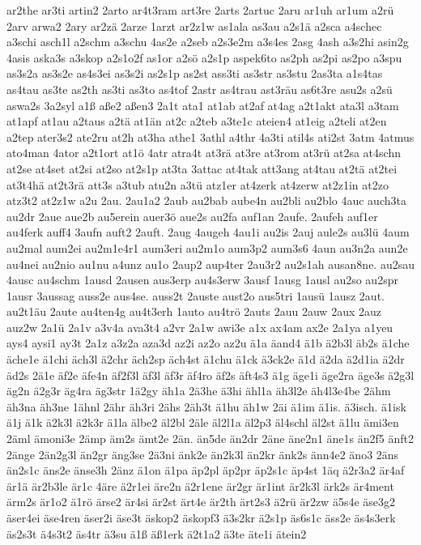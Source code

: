 {ar2the
ar3ti
artin2
2arto
ar4t3ram
art3re
2arts
2artuc
2aru
ar1uh
ar1um
a2rü
2arv
arwa2
2ary
ar2zä
2arze
1arzt
ar2z1w
as1ala
as3au
a2s1ä
a2sca
a4schec
a3schi
asch1l
a2schm
a3schu
4as2e
a2seb
a2s3e2m
a3s4es
2asg
4ash
a3s2hi
asin2g
4asis
aska3s
a3skop
a2s1o2f
as1or
a2sö
a2s1p
aspek6to
as2ph
as2pi
as2po
a3spu
as3s2a
as3s2e
as4s3ei
as3s2i
as2s1p
as2st
ass3ti
as3str
as3stu
2as3ta
a1s4tas
as4tau
as3te
as2th
as3ti
as3to
as4tof
2astr
as4trau
ast3räu
as6t3re
asu2s
a2sü
aswa2s
3a2syl
a1ß
aße2
aßen3
2a1t
ata1
at1ab
at2af
at4ag
a2t1akt
ata3l
a3tam
at1apf
at1au
a2taus
a2tä
at1än
at2c
a2teb
a3te1c
ateien4
at1eig
a2teli
at2en
a2tep
ater3s2
ate2ru
at2h
at3ha
athe1
3athl
a4thr
4a3ti
atil4s
ati2st
3atm
4atmus
ato4man
4ator
a2t1ort
at1ö
4atr
atra4t
at3rä
at3re
at3rom
at3rü
at2sa
at4schn
at2se
at4set
at2si
at2so
at2s1p
at3ta
3attac
at4tak
att3ang
at4tau
at2tä
at2tei
at3t4hä
at2t3rä
att3s
a3tub
atu2n
a3tü
atz1er
at4zerk
at4zerw
at2z1in
at2zo
atz3t2
at2z1w
a2u
2au.
2au1a2
2aub
au2bab
aube4n
au2bli
au2blo
4auc
auch3ta
au2dr
2aue
aue2b
au5erein
auer3ö
aue2s
au2fa
auf1an
2aufe.
2aufeh
auf1er
au4ferk
auff4
3aufn
auft2
2auft.
2aug
4augeh
4au1i
au2is
2auj
aule2s
au3lü
4aum
au2mal
aum2ei
au2m1e4r1
aum3eri
au2m1o
aum3p2
aum3s6
4aun
au3n2a
aun2e
au4nei
au2nio
au1nu
a4unz
au1o
2aup2
aup4ter
2au3r2
au2s1ah
ausan8ne.
au2sau
4ausc
au4schm
1ausd
2ausen
aus3erp
au4s3erw
3ausf
1ausg
1ausl
au2so
au2spr
1ausr
3aussag
auss2e
aus4se.
auss2t
2auste
aust2o
aus5tri
1ausü
1ausz
2aut.
au2t1äu
2aute
au4ten4g
au4t3erh
1auto
au4trö
2auts
2auu
2auw
2aux
2auz
auz2w
2a1ü
2a1v
a3v4a
ava3t4
a2vr
2a1w
awi3e
a1x
ax4am
ax2e
2a1ya
a1yeu
ays4
aysi1
ay3t
2a1z
a3z2a
aza3d
az2i
az2o
az2u
ä1a
äand4
ä1b
ä2b3l
äb2s
ä1che
äche1e
ä1chi
äch3l
ä2chr
äch2sp
äch4st
ä1chu
ä1ck
ä3ck2e
ä1d
ä2da
ä2d1ia
ä2dr
äd2s
2ä1e
äf2e
äfe4n
äf2f3l
äf3l
äf3r
äf4ro
äf2s
äft4s3
ä1g
äge1i
äge2ra
äge3s
ä2g3l
äg2n
ä2g3r
äg4ra
äg3str
1ä2gy
äh1a
2ä3he
ä3hi
ähl1a
äh3l2e
äh4l3e4be
2ähm
äh3na
äh3ne
1ähnl
2ähr
äh3ri
2ähs
2äh3t
ä1hu
äh1w
2äi
ä1im
ä1is.
ä3isch.
ä1isk
ä1j
ä1k
ä2k3l
ä2k3r
ä1la
älbe2
äl2bl
2äle
äl2l1a
äl2p3
äl4schl
äl2st
ä1lu
ämi3en
2äml
ämoni3e
2ämp
äm2s
ämt2e
2än.
än5de
än2dr
2äne
äne2n1
äne1s
än2f5
änft2
2änge
2än2g3l
än2gr
äng3se
2ä3ni
änk2e
än2k3l
än2kr
änk2s
änn4e2
äno3
2äns
än2s1c
äns2e
änse3h
2änz
ä1on
ä1pa
äp2pl
äp2pr
äp2s1c
äp4st
1äq
ä2r3a2
är4af
är1ä
är2b3le
är1c
4äre
ä2r1ei
äre2n
ä2r1ene
är2gr
är1int
är2k3l
ärk2s
är4ment
ärm2s
är1o2
ä1rö
ärse2
är4si
är2st
ärt4e
är2th
ärt2s3
ä2rü
är2zw
ä5s4e
äse3g2
äser4ei
äse4ren
äser2i
äse3t
äskop2
äskopf3
ä3s2kr
ä2s1p
äs6s1c
äss2e
äs4s3erk
äs2s3t
ä4s3t2
äs4tr
ä3su
ä1ß
äß1erk
ä2t1a2
ä3te
äte1i
ätein2
}
